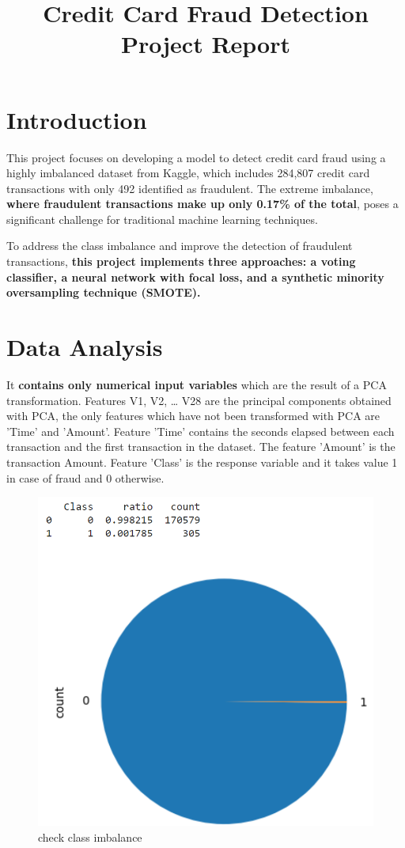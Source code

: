 \documentclass[12pt]{article}
\title{
    \vspace{0.5 cm}
    Credit Card Fraud Detection Project Report
}
\begin{document}
\maketitle 

\section{Introduction}

This project focuses on developing a model to detect credit card fraud using a highly imbalanced dataset from Kaggle, which includes 284,807 credit card transactions with only 492 identified as fraudulent. The extreme imbalance,\textbf{ where fraudulent transactions make up only 0.17\% of the total}, poses a significant challenge for traditional machine learning techniques.

\hfill \break
To address the class imbalance and improve the detection of fraudulent transactions, \textbf{this project implements three approaches: a voting classifier, a neural network with focal loss, and a synthetic minority oversampling technique (SMOTE).}

\section{Data Analysis}

It \textbf{contains only numerical input variables} which are the result of a PCA transformation. Features V1, V2, … V28 are the principal components obtained with PCA, the only features which have not been transformed with PCA are 'Time' and 'Amount'. Feature 'Time' contains the seconds elapsed between each transaction and the first transaction in the dataset. The feature 'Amount' is the transaction Amount. Feature 'Class' is the response variable and it takes value 1 in case of fraud and 0 otherwise.

\begin{figure}
    \centering
    \includegraphics[width=0.40\linewidth]{class_Ratio.png}
    \caption{check class imbalance}
    \label{fig: Check class imbalance}
\end{figure}
\end{document}
